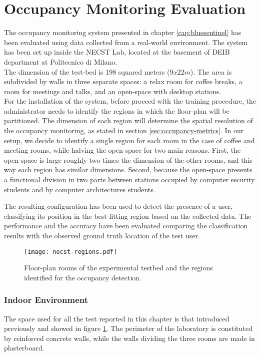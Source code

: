 \section{Occupancy Monitoring Evaluation}
\label{sec:bs-test}
The occupancy monitoring system presented in chapter \ref{cap:bluesentinel} has been evaluated using data collected from a real-world environment. The system has been set up inside the NECST Lab, located at the basement of DEIB department at Politecnico di Milano.\\
The dimension of the test-bed is 198 squared meters ($9x22m$). The area is subdivided by walls in three separate spaces: a relax room for coffee breaks, a room for meetings and talks, and an open-space with desktop stations.\\
For the installation of the system, before proceed with the training procedure, the administrator needs to identify the regions in which the floor-plan will be partitioned. The dimension of each region will determine the spatial resolution of the occupancy monitoring, as stated in section \ref{sec:occupancy-metrics}. In our setup, we decide to identify a single region for each room in the case of coffee and meeting rooms, while halving the open-space for two main reasons. First, the open-space is large roughly two times the dimension of the other rooms, and this way each region has similar dimensions. Second, because the open-space presents a functional division in two parts between stations occupied by computer security students and by computer architectures students.

The resulting configuration has been used to detect the presence of a user, classifying its position in the best fitting region based on the collected data. The performance and the accuracy have been evaluated comparing the classification results with the observed ground truth location of the test user.

\begin{figure}[h!tb]
\centering\texttt{[image: necst-regions.pdf]}
\caption[Floor-plan rooms of the experimental testbed and the regions identified for the occupancy detection.]{Floor-plan rooms of the experimental testbed and the regions identified for the occupancy detection.}
\label{fig:regions}
\end{figure}

\subsubsection{Indoor Environment}
\label{test-env}
The space used for all the test reported in this chapter is that introduced previously and showed in figure \ref{fig:regions}. The perimeter of the laboratory is constituted by reinforced concrete walls, while the walls dividing the three rooms are made in plasterboard.

